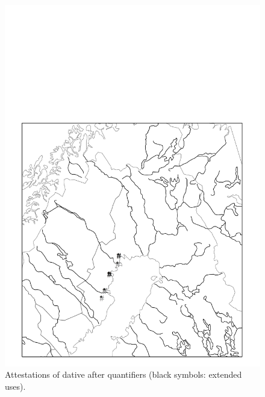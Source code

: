 \begin{figure}[h]
\includegraphics[height=.5\textheight]{figures/18_AttestationsofDatives}
\caption{Attestations of dative after quantifiers (black symbols: extended uses).}
\label{map:14}

\end{figure}

